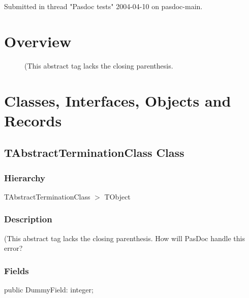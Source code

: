 \documentclass{report}
\newif\ifpdf
\begin{document}
Submitted in thread "Pasdoc tests" 2004{-}04{-}10 on pasdoc{-}main.
\section{Overview}
\begin{description}
\item[\texttt{\begin{ttfamily}TAbstractTerminationClass\end{ttfamily} Class}](This abstract tag lacks the closing parenthesis.
\end{description}
\section{Classes, Interfaces, Objects and Records}
\ifpdf
\subsection*{\large{\textbf{TAbstractTerminationClass Class}}\normalsize\hspace{1ex}\hrulefill}
\else
\subsection*{TAbstractTerminationClass Class}
\fi
\label{warning_abstract_termination.TAbstractTerminationClass}
\subsubsection*{\large{\textbf{Hierarchy}}\normalsize\hspace{1ex}\hfill}
TAbstractTerminationClass {$>$} TObject
\subsubsection*{\large{\textbf{Description}}\normalsize\hspace{1ex}\hfill}
(This abstract tag lacks the closing parenthesis. How will PasDoc handle this error?\subsubsection*{\large{\textbf{Fields}}\normalsize\hspace{1ex}\hfill}
\begin{list}{}{
\setlength{\itemindent}{0cm}
\setlength{\listparindent}{0cm}
\setlength{\leftmargin}{\evensidemargin}
\addtolength{\leftmargin}{\tmplength}
\settowidth{\labelsep}{X}
\addtolength{\leftmargin}{\labelsep}
\setlength{\labelwidth}{\tmplength}
}
\label{warning_abstract_termination.TAbstractTerminationClass-DummyField}
\item[\textbf{DummyField}\hfill]
\ifpdf
\begin{flushleft}
\fi
\begin{ttfamily}
public DummyField: integer;\end{ttfamily}

\ifpdf
\end{flushleft}
\fi


\par  \end{list}
\end{document}
